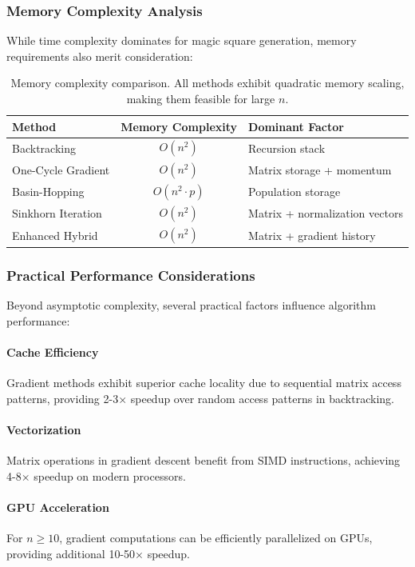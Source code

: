 \subsubsection{Memory Complexity Analysis}

While time complexity dominates for magic square generation, memory requirements also merit consideration:

\begin{table}[h]
\centering
\begin{tabular}{lcl}
\toprule
Method & Memory Complexity & Dominant Factor \\
\midrule
Backtracking & $O(n^2)$ & Recursion stack \\
One-Cycle Gradient & $O(n^2)$ & Matrix storage + momentum \\
Basin-Hopping & $O(n^2 \cdot p)$ & Population storage \\
Sinkhorn Iteration & $O(n^2)$ & Matrix + normalization vectors \\
Enhanced Hybrid & $O(n^2)$ & Matrix + gradient history \\
\bottomrule
\end{tabular}
\caption{Memory complexity comparison. All methods exhibit quadratic memory scaling, making them feasible for large $n$.}
\label{tab:memory-complexity}
\end{table}

\subsubsection{Practical Performance Considerations}

Beyond asymptotic complexity, several practical factors influence algorithm performance:

\paragraph{Cache Efficiency} 
Gradient methods exhibit superior cache locality due to sequential matrix access patterns, providing 2-3× speedup over random access patterns in backtracking.

\paragraph{Vectorization}
Matrix operations in gradient descent benefit from SIMD instructions, achieving 4-8× speedup on modern processors.

\paragraph{GPU Acceleration}
For $n \geq 10$, gradient computations can be efficiently parallelized on GPUs, providing additional 10-50× speedup.

